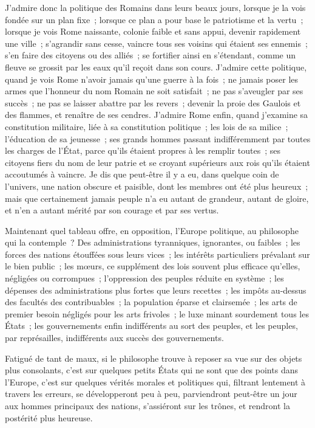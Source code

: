 \documentclass[french,twoside]{book} %
\begin{document}
J’admire donc la politique des Romains dans leurs beaux jours, lorsque je la vois fondée sur un plan fixe ; lorsque ce plan a pour base le patriotisme et la vertu ; lorsque je vois Rome naissante, colonie faible et sans appui, devenir rapidement une ville ; s’agrandir sans cesse, vaincre tous ses voisins qui étaient ses ennemis ; s’en faire des citoyens ou des alliés ; se fortifier ainsi en s’étendant, comme un fleuve se grossit par les eaux qu’il reçoit dans son cours. J’admire cette politique, quand je vois Rome n’avoir jamais qu’une guerre à la fois ; ne jamais poser les armes que l’honneur du nom Romain ne soit satisfait ; ne pas s’aveugler par ses succès ; ne pas se laisser abattre par les revers ; devenir la proie des Gaulois et des flammes, et renaître de ses cendres. J’admire Rome enfin, quand j’examine sa constitution militaire, liée à sa constitution politique ; les lois de sa milice ; l’éducation de sa jeunesse ; ses grands hommes passant indifféremment par toutes les charges de l’État, parce qu’ils étaient propres à les remplir toutes ; ses citoyens fiers du nom de leur patrie et se croyant supérieurs aux rois qu’ils étaient accoutumés à vaincre. Je dis que peut-être il y a eu, dans quelque coin de l’univers, une nation obscure et paisible, dont les membres ont été plus heureux ; mais que certainement jamais peuple n’a eu autant de grandeur, autant de gloire, et n’en a autant mérité par son courage et par ses vertus.\par
Maintenant quel tableau offre, en opposition, l’Europe politique, au philosophe qui la contemple ? Des administrations tyranniques, ignorantes, ou faibles ; les forces des nations étouffées sous leurs vices ; les intérêts particuliers prévalant sur le bien public ; les mœurs, ce supplément des lois souvent plus efficace qu’elles, négligées ou corrompues ; l’oppression des peuples réduite en système ; les dépenses des administrations plus fortes que leurs recettes ; les impôts au-dessus des facultés des contribuables ; la population éparse et clairsemée ; les arts de premier besoin négligés pour les arts frivoles ; le luxe minant sourdement tous les États ; les gouvernements enfin indifférents au sort des peuples, et les peuples, par représailles, indifférents aux succès des gouvernements.\par
Fatigué de tant de maux, si le philosophe trouve à reposer sa vue sur des objets plus consolants, c’est sur quelques petits États qui ne sont que des points dans l’Europe, c’est sur quelques vérités morales et politiques qui, filtrant lentement à travers les erreurs, se développeront peu à peu, parviendront peut-être un jour aux hommes principaux des nations, s’assiéront sur les trônes, et rendront la postérité plus heureuse.\par
\end{document}

